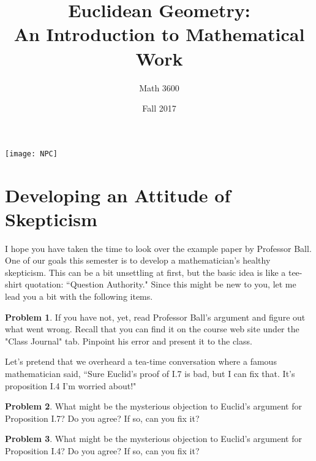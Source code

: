 \documentclass{tufte-handout}
\title{Euclidean Geometry:\\An Introduction to Mathematical Work}
\author[]{Math 3600}
\date{Fall 2017}
\theoremstyle{definition}
\newtheorem{problem}{Problem}[section]
\begin{document}
\maketitle
\begin{marginfigure}
    \texttt{[image: NPC]}
\end{marginfigure}

\setcounter{section}{4}
\section{Developing an Attitude of Skepticism}

I hope you have taken the time to look over the example paper by Professor Ball.
One of our goals this semester is to develop a mathematician's healthy skepticism.
This can be a bit unsettling at first, but the basic idea is like a tee-shirt quotation: ``Question Authority."
Since this might be new to you, let me lead you a bit with the following items.

\begin{problem}\label{prob:Ball}
If you have not, yet, read Professor Ball's argument and figure out what went wrong.
Recall that you can find it on the course web site under the "Class Journal" tab.
Pinpoint his error and present it to the class.
\end{problem}

Let's pretend that we overheard a tea-time conversation where a famous mathematician said, ``Sure Euclid's proof of I.7 is bad, but I can fix that.
It's proposition I.4 I'm worried about!"

\begin{problem}\label{prob:fix-I.7}
What might be the mysterious objection to Euclid's argument for Proposition I.7? Do you agree? If so, can you fix it?
\end{problem}

\begin{problem}\label{prob:fix-I.4}
What might be the mysterious objection to Euclid's argument for Proposition I.4? Do you agree? If so, can you fix it?
\end{problem}
\end{document}
